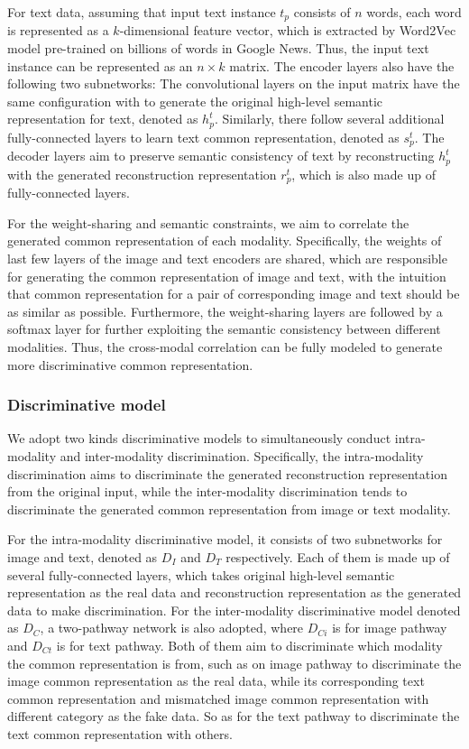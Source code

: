 \documentclass[journal]{IEEEtran}
\begin{document}
For text data, assuming that input text instance $t_p$ consists of $n$ words, each word is represented as a $k$-dimensional feature vector, which is extracted by Word2Vec model \cite{DBLP:conf/nips/MikolovSCCD13} pre-trained on billions of words in Google News. Thus, the input text instance can be represented as an $n\times k$ matrix. The encoder layers also have the following two subnetworks: The convolutional layers on the input matrix have the same configuration with \cite{DBLP:conf/emnlp/Kim14} to generate the original high-level semantic representation for text, denoted as $h_p^t$. Similarly, there follow several additional fully-connected layers to learn text common representation, denoted as $s_p^t$. The decoder layers aim to preserve semantic consistency of text by reconstructing $h_p^t$ with the generated reconstruction representation $r_p^t$, which is also made up of fully-connected layers.

For the weight-sharing and semantic constraints, we aim to correlate the generated common representation of each modality. Specifically, the weights of last few layers of the image and text encoders are shared, which are responsible for generating the common representation of image and text, with the intuition that common representation for a pair of corresponding image and text should be as similar as possible. Furthermore, the weight-sharing layers are followed by a softmax layer for further exploiting the semantic consistency between different modalities. Thus, the cross-modal correlation can be fully modeled to generate more discriminative common representation.

\subsubsection{\textbf{Discriminative model}} We adopt two kinds discriminative models to simultaneously conduct intra-modality and inter-modality discrimination. Specifically, the intra-modality discrimination aims to discriminate the generated reconstruction representation from the original input, while the inter-modality discrimination tends to discriminate the generated common representation from image or text modality.

For the intra-modality discriminative model, it consists of two subnetworks for image and text, denoted as $D_I$ and $D_T$ respectively. Each of them is made up of several fully-connected layers, which takes original high-level semantic representation as the real data and reconstruction representation as the generated data to make discrimination.
For the inter-modality discriminative model denoted as $D_C$, a two-pathway network is also adopted, where $D_{Ci}$ is for image pathway and $D_{Ct}$ is for text pathway. Both of them aim to discriminate which modality the common representation is from, such as on image pathway to discriminate the image common representation as the real data, while its corresponding text common representation and mismatched image common representation with different category as the fake data. So as for the text pathway to discriminate the text common representation with others.
\end{document}
